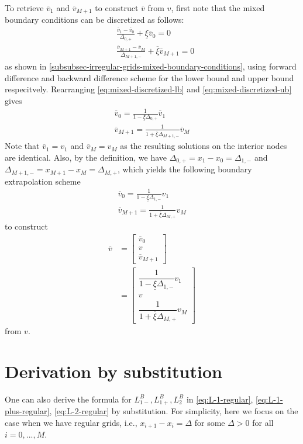 \documentclass[11pt]{article}
\theoremstyle{definition}
\begin{document}
To retrieve $\overline{v}_1 $ and $\overline{v}_{M+1}$ to construct $\overline{v}$ from $v$, first note that the mixed boundary conditions can be discretized as follows:
\begin{align}
&\frac{\overline{v}_1 - \overline{v}_0}{\Delta_{0,+}} + \underline{\xi} \overline{v}_0 = 0 \label{eq:mixed-discretized-lb} \\
&\frac{\overline{v}_{M+1} - \overline{v}_M}{\Delta_{M+1,-}} + \overline{\xi} \overline{v}_{M+1} = 0 \label{eq:mixed-discretized-ub}
\end{align}
as shown in \ref{subsubsec-irregular-grids-mixed-boundary-conditions}, using forward difference and backward difference scheme for the lower bound and upper bound respecitvely. Rearranging \eqref{eq:mixed-discretized-lb} and \eqref{eq:mixed-discretized-ub} gives
\begin{align}
\overline{v}_0 = \frac{1}{1-\underline{\xi} \Delta_{0,+} } \overline{v}_1 \\
\overline{v}_{M+1} = \frac{1}{1+\overline{\xi} \Delta_{M+1,-} } \overline{v}_M
\end{align}
Note that $\overline{v}_1 = v_1$ and $\overline{v}_M = v_M$ as the resulting solutions on the interior nodes are identical. Also, by the definition, we have $\Delta_{0,+} = x_1 - x_0 = \Delta_{1,-}$ and $\Delta_{M+1,-} = x_{M+1} - x_M = \Delta_{M, +}$, which yields the following boundary extrapolation scheme
\begin{align}
\overline{v}_0 = \frac{1}{1-\underline{\xi} \Delta_{1,-} } {v}_1 \\
\overline{v}_{M+1} = \frac{1}{1+\overline{\xi} \Delta_{M,+} } {v}_M
\end{align}
to construct
\begin{align}
\overline{v} &= \begin{bmatrix}
\overline{v}_0 \\
v  \\
\overline{v}_{M+1}
\end{bmatrix} \\ &=
\begin{bmatrix}
\dfrac{1}{1-\underline{\xi} \Delta_{1,-} } {v}_1 \\
v  \\
\dfrac{1}{1+\overline{\xi} \Delta_{M,+} } {v}_M
\end{bmatrix} 
\end{align}
from $v$.

\section{Derivation by substitution}
One can also derive the formula for $L_{1-}^B, L_{1+}^B, L_2^B$ in \eqref{eq:L-1-regular}, \eqref{eq:L-1-plus-regular}, \eqref{eq:L-2-regular} by substitution. For simplicity, here we focus on the case when we have regular grids, i.e., $x_{i+1} - x_i = \Delta$ for some $\Delta > 0$ for all $i = 0, ..., M$.
\end{document}
